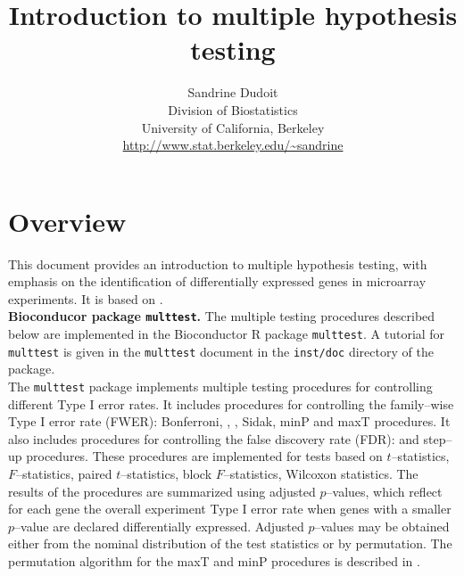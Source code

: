 \documentclass[11pt]{article}
\begin{document}
\title{\bf Introduction to multiple hypothesis testing}
\author{Sandrine Dudoit\\
Division of Biostatistics\\
University of California, Berkeley\\
\url{http://www.stat.berkeley.edu/~sandrine}}

\maketitle

\vspace{2cm}

\tableofcontents

\newpage

\section{Overview}

This document provides an introduction to multiple hypothesis testing, with emphasis on the identification of differentially expressed genes in microarray experiments. It is based on \cite{Dudoit&Shaffer02}. \\

{\bf Bioconducor package {\tt multtest}.} The multiple testing procedures described below are implemented in the Bioconductor R package {\tt multtest}. A tutorial for {\tt multtest} is given in the {\tt multtest} document in the {\tt inst/doc} directory of the package. \\

The {\tt multtest} package implements multiple testing procedures for controlling different Type I error rates. It includes procedures for controlling the family--wise Type I error rate (FWER): Bonferroni, \cite{Hochberg88}, \cite{Holm79}, Sidak, \cite{Westfall&Young93} minP and maxT procedures. It also includes procedures for controlling the false discovery rate (FDR): \cite{Benjamini&Hochberg95} and \cite{Benjamini&Yekutieli01} step--up procedures. These procedures are implemented for tests based on $t$--statistics, $F$--statistics, paired $t$--statistics, block $F$--statistics, Wilcoxon statistics. The results of the procedures are summarized using adjusted $p$--values, which reflect for each gene the overall experiment Type I error rate when genes with a smaller $p$--value are declared differentially expressed. Adjusted $p$--values may be obtained either from the nominal distribution of the test statistics or by permutation. The permutation algorithm for the maxT and minP procedures is described in \cite{Ge&Dudoit}.\\
\end{document}
